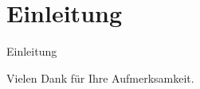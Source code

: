 \documentclass[10pt]{beamer}
\title{}
\date{}
\author{Michael Wolz}
\institute{Universität Trier - Titel}
\begin{document}
\maketitle




\section{Einleitung}

\begin{frame}[fragile]{Einleitung}
\end{frame}



\begin{frame}[standout]
  Vielen Dank für Ihre Aufmerksamkeit.
\end{frame}
\end{document}
